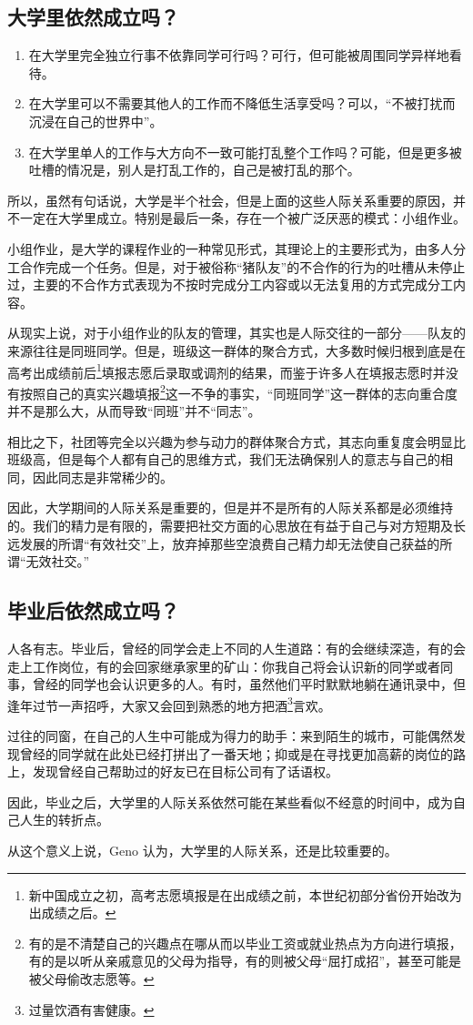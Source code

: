     \subsection{大学里依然成立吗？}\label{subsec:Uncategorized/IsUniversityInterpersonImportant/IsItInUniversity}
        \begin{enumerate}
            \item 在大学里完全独立行事不依靠同学可行吗？可行，但可能被周围同学异样地看待。
            \item 在大学里可以不需要其他人的工作而不降低生活享受吗？可以，“不被打扰而沉浸在自己的世界中”。
            \item 在大学里单人的工作与大方向不一致可能打乱整个工作吗？可能，但是更多被吐槽的情况是，别人是打乱工作的，自己是被打乱的那个。
        \end{enumerate}
        所以，虽然有句话说，大学是半个社会，但是上面的这些人际关系重要的原因，并不一定在大学里成立。特别是最后一条，存在一个被广泛厌恶的模式：小组作业。

        小组作业，是大学的课程作业的一种常见形式，其理论上的主要形式为，由多人分工合作完成一个任务。但是，对于被俗称“猪队友”的不合作的行为的吐槽从未停止过，主要的不合作方式表现为不按时完成分工内容或以无法复用的方式完成分工内容。

        从现实上说，对于小组作业的队友的管理，其实也是人际交往的一部分——队友的来源往往是同班同学。但是，班级这一群体的聚合方式，大多数时候归根到底是在高考出成绩前后\footnote{新中国成立之初，高考志愿填报是在出成绩之前，本世纪初部分省份开始改为出成绩之后。}填报志愿后录取或调剂的结果，而鉴于许多人在填报志愿时并没有按照自己的真实兴趣填报\footnote{有的是不清楚自己的兴趣点在哪从而以毕业工资或就业热点为方向进行填报，有的是以听从亲戚意见的父母为指导，有的则被父母“屈打成招”，甚至可能是被父母偷改志愿等。}这一不争的事实，“同班同学”这一群体的志向重合度并不是那么大，从而导致“同班”并不“同志”。

        相比之下，社团等完全以兴趣为参与动力的群体聚合方式，其志向重复度会明显比班级高，但是每个人都有自己的思维方式，我们无法确保别人的意志与自己的相同，因此同志是非常稀少的。

        因此，大学期间的人际关系是重要的，但是并不是所有的人际关系都是必须维持的。我们的精力是有限的，需要把社交方面的心思放在有益于自己与对方短期及长远发展的所谓“有效社交”上，放弃掉那些空浪费自己精力却无法使自己获益的所谓“无效社交。”

    \subsection{毕业后依然成立吗？}\label{subsec:Uncategorized/IsUniversityInterpersonImportant/IsItAfterUniversity}
        人各有志。毕业后，曾经的同学会走上不同的人生道路：有的会继续深造，有的会走上工作岗位，有的会回家继承家里的矿山：你我自己将会认识新的同学或者同事，曾经的同学也会认识更多的人。有时，虽然他们平时默默地躺在通讯录中，但逢年过节一声招呼，大家又会回到熟悉的地方把酒\footnote{过量饮酒有害健康。}言欢。

        过往的同窗，在自己的人生中可能成为得力的助手：来到陌生的城市，可能偶然发现曾经的同学就在此处已经打拼出了一番天地；抑或是在寻找更加高薪的岗位的路上，发现曾经自己帮助过的好友已在目标公司有了话语权。

    因此，毕业之后，大学里的人际关系依然可能在某些看似不经意的时间中，成为自己人生的转折点。

    从这个意义上说，Geno 认为，大学里的人际关系，还是比较重要的。
